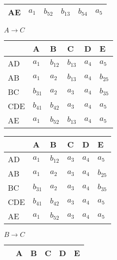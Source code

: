 \documentclass[10pt, a4paper]{article}
\begin{document}
\begin{enumerate}
\begin{enumerate}
\begin{figure}[H]
\begin{minipage}[b]{0.5\linewidth}
\begin{tabular}{|l|l|l|l|l|l|}
						AE  & $a_1$ & $b_{52}$ & $b_{13}$ & $b_{54}$ & $a_5$ \\ \hline
						\end{tabular}
						\caption{$A\to C$}\label{tab:2}
				\end{minipage}
			\end{figure}
			\begin{figure}[H]
				\begin{minipage}[b]{0.5\linewidth}
					\centering
					\begin{tabular}{|l|l|l|l|l|l|}
						\hline
							& A & B & C & D & E \\ \hline
						AD  & $a_1$ & $b_{12}$ & $b_{13}$  & $a_4$  & $a_5$  \\ \hline
						AB  & $a_1$ & $a_2$  & $b_{13}$  & $a_4$ & $b_{25}$  \\ \hline
						BC  & $b_{31}$ &  $a_2$ & $a_3$ & $a_4$ & $b_{35}$ \\ \hline
						CDE & $b_{41}$ & $b_{42}$ & $a_3$ & $a_4$ & $a_5$ \\ \hline
						AE  & $a_1$ & $b_{52}$ & $b_{13}$ & $a_4$ & $a_5$ \\ \hline
						\end{tabular}
						\caption{$C\to D$}\label{tab:3}
				\end{minipage}
				\begin{minipage}[b]{0.5\linewidth}
					\centering
					\begin{tabular}{|l|l|l|l|l|l|}
						\hline
							& A & B & C & D & E \\ \hline
						AD  & $a_1$ & $b_{12}$ & $a_3$  & $a_4$  & $a_5$  \\ \hline
						AB  & $a_1$ & $a_2$  & $a_3$  & $a_4$ & $b_{25}$  \\ \hline
						BC  & $b_{31}$ &  $a_2$ & $a_3$ & $a_4$ & $b_{35}$ \\ \hline
						CDE & $b_{41}$ & $b_{42}$ & $a_3$ & $a_4$ & $a_5$ \\ \hline
						AE  & $a_1$ & $b_{52}$ & $a_3$ & $a_4$ & $a_5$ \\ \hline
						\end{tabular}
						\caption{$B\to C$}\label{tab:4}
				\end{minipage}
			\end{figure}
			\begin{figure}[H]
				\begin{minipage}[b]{0.5\linewidth}
					\centering
					\begin{tabular}{|l|l|l|l|l|l|}
						\hline
							& A & B & C & D & E \\ \hline

\end{tabular}
\end{minipage}
\end{figure}
\end{enumerate}
\end{enumerate}
\end{document}
